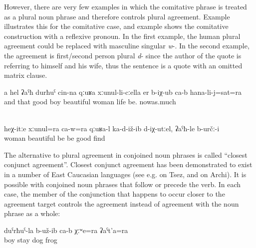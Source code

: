 However, there are very few examples in which the comitative phrase is treated as a plural noun phrase and therefore controls plural agreement. Example  illustrates this for the comitative case, and example  shows the comitative construction with a reflexive pronoun. In the first example, the human plural agreement could be replaced with masculine singular \textit{w}-. In the second example, the agreement is first/second person plural \textit{d}- since the author of the quote is referring to himself and his wife, thus the sentence is a quote with an omitted matrix clause.
%
\begin{exe}
	\ex	\label{ex:‎The good boy with this beautiful wife lived until now}
	\gll	a	hel	ʡaˁħ	durħuˁ	cin-na	qːuʁa	xːunul-li-cːella er b-iχ-ub ca-b hana-li-j=sat=ra\\
		and	that	good	boy		beautiful	woman	life	be.		nowas.much\\
	\glt	{}

	\\	\label{ex:If he would sit together with his wife well like this, this would be good}
	\gll	heχ-itːe xːunul=ra	ca-w=ra	qːuʁa-l	ka-d-iž-ib	d-iχ-utːel,	ʡaˁħ-le	b-určː-i\\
			woman		beautiful	be	be	good	find\\
	\glt	{}
\end{exe}

The alternative to plural agreement in conjoined noun phrases is called ``closest conjunct agreement''. Closest conjunct agreement has been demonstrated to exist in a number of East Caucasian languages (see e.g. \citealp{Polinsky.etal2009} on Tsez, and \citealp{Chumakina2014} on Archi). It is possible with conjoined noun phrases that follow or precede the verb. In each case, the member of the conjunction that happens to occur closer to the agreement target controls the agreement instead of agreement with the noun phrase as a whole:
%
\begin{exe}
	\ex	\label{ex:‎The boy had a dog and a frog}
	\gll	duˁrħuˁ-la	b-už-ib	ca-b	χːʷe=ra	ʡaˁt'a=ra\\
		boy	stay		dog\tsc{=add}	frog\\
	\glt	{}
\end{exe}

